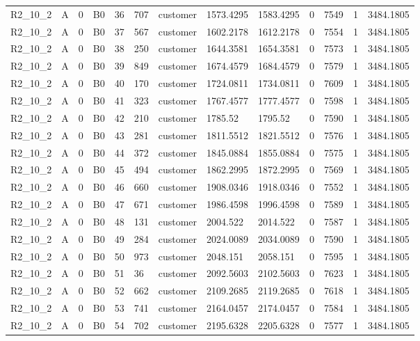 \begin{longtable}{lllllllllllll}
R2\_10\_2 & A & 0 & B0 & 36 & 707 & customer & 1573.4295 & 1583.4295 & 0 & 7549 & 1 & 3484.1805 \\
R2\_10\_2 & A & 0 & B0 & 37 & 567 & customer & 1602.2178 & 1612.2178 & 0 & 7554 & 1 & 3484.1805 \\
R2\_10\_2 & A & 0 & B0 & 38 & 250 & customer & 1644.3581 & 1654.3581 & 0 & 7573 & 1 & 3484.1805 \\
R2\_10\_2 & A & 0 & B0 & 39 & 849 & customer & 1674.4579 & 1684.4579 & 0 & 7579 & 1 & 3484.1805 \\
R2\_10\_2 & A & 0 & B0 & 40 & 170 & customer & 1724.0811 & 1734.0811 & 0 & 7609 & 1 & 3484.1805 \\
R2\_10\_2 & A & 0 & B0 & 41 & 323 & customer & 1767.4577 & 1777.4577 & 0 & 7598 & 1 & 3484.1805 \\
R2\_10\_2 & A & 0 & B0 & 42 & 210 & customer & 1785.52 & 1795.52 & 0 & 7590 & 1 & 3484.1805 \\
R2\_10\_2 & A & 0 & B0 & 43 & 281 & customer & 1811.5512 & 1821.5512 & 0 & 7576 & 1 & 3484.1805 \\
R2\_10\_2 & A & 0 & B0 & 44 & 372 & customer & 1845.0884 & 1855.0884 & 0 & 7575 & 1 & 3484.1805 \\
R2\_10\_2 & A & 0 & B0 & 45 & 494 & customer & 1862.2995 & 1872.2995 & 0 & 7569 & 1 & 3484.1805 \\
R2\_10\_2 & A & 0 & B0 & 46 & 660 & customer & 1908.0346 & 1918.0346 & 0 & 7552 & 1 & 3484.1805 \\
R2\_10\_2 & A & 0 & B0 & 47 & 671 & customer & 1986.4598 & 1996.4598 & 0 & 7589 & 1 & 3484.1805 \\
R2\_10\_2 & A & 0 & B0 & 48 & 131 & customer & 2004.522 & 2014.522 & 0 & 7587 & 1 & 3484.1805 \\
R2\_10\_2 & A & 0 & B0 & 49 & 284 & customer & 2024.0089 & 2034.0089 & 0 & 7590 & 1 & 3484.1805 \\
R2\_10\_2 & A & 0 & B0 & 50 & 973 & customer & 2048.151 & 2058.151 & 0 & 7595 & 1 & 3484.1805 \\
R2\_10\_2 & A & 0 & B0 & 51 & 36 & customer & 2092.5603 & 2102.5603 & 0 & 7623 & 1 & 3484.1805 \\
R2\_10\_2 & A & 0 & B0 & 52 & 662 & customer & 2109.2685 & 2119.2685 & 0 & 7618 & 1 & 3484.1805 \\
R2\_10\_2 & A & 0 & B0 & 53 & 741 & customer & 2164.0457 & 2174.0457 & 0 & 7584 & 1 & 3484.1805 \\
R2\_10\_2 & A & 0 & B0 & 54 & 702 & customer & 2195.6328 & 2205.6328 & 0 & 7577 & 1 & 3484.1805 \\

\end{longtable}
